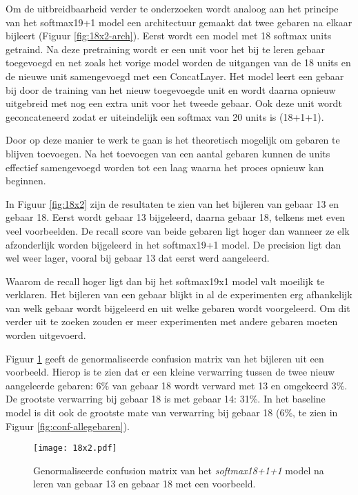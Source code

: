 Om de uitbreidbaarheid verder te onderzoeken wordt analoog aan het principe van het softmax19+1 model een architectuur gemaakt dat twee gebaren na elkaar bijleert (Figuur \ref{fig:18x2-arch}). Eerst wordt een model met 18 softmax units getraind. Na deze pretraining wordt er een unit voor het bij te leren gebaar toegevoegd en net zoals het vorige model worden de uitgangen van de 18 units en de nieuwe unit samengevoegd met een ConcatLayer.
\npar Het model leert een gebaar bij door de training van het nieuw toegevoegde unit en wordt daarna opnieuw uitgebreid met nog een extra unit voor het tweede gebaar. Ook deze unit wordt geconcateneerd zodat er uiteindelijk een softmax van 20 units is (18+1+1).

\npar Door op deze manier te werk te gaan is het theoretisch mogelijk om gebaren te blijven toevoegen. Na het toevoegen van een aantal gebaren kunnen de units effectief samengevoegd worden tot een laag waarna het proces opnieuw kan beginnen.

\npar In Figuur \ref{fig:18x2} zijn de resultaten te zien van het bijleren van gebaar 13 en gebaar 18. Eerst wordt gebaar 13 bijgeleerd, daarna gebaar 18, telkens met even veel voorbeelden. De recall score van beide gebaren ligt hoger dan wanneer ze elk afzonderlijk worden bijgeleerd in het softmax19+1 model. De precision ligt dan wel weer lager, vooral bij gebaar 13 dat eerst werd aangeleerd.

\npar Waarom de recall hoger ligt dan bij het softmax19x1 model valt moeilijk te verklaren. Het bijleren van een gebaar blijkt in al de experimenten erg afhankelijk van welk gebaar wordt bijgeleerd en uit welke gebaren wordt voorgeleerd. Om dit verder uit te zoeken zouden er meer experimenten met andere gebaren moeten worden uitgevoerd.

\npar Figuur \ref{fig:conf-18x2} geeft de genormaliseerde confusion matrix van het bijleren uit een voorbeeld. Hierop is te zien dat er een kleine verwarring tussen de twee nieuw aangeleerde gebaren: 6\% van gebaar 18 wordt verward met 13 en omgekeerd 3\%. De grootste verwarring bij gebaar 18 is met gebaar 14: 31\%. In het baseline model is dit ook de grootste mate van verwarring bij gebaar 18 (6\%, te zien in Figuur \ref{fig:conf-allegebaren}).


\begin{figure}
	\centering
	\texttt{[image: 18x2.pdf]}
	\caption{Precision en recall na het bijleren van gebaar 13 en gebaar 18 in het \textit{softmax18+1+1} model. Ter vergelijking is het resultaat van het \textit{softmax19+1} model ook uitgetekend.}\label{fig:18x2}
	\vspace{1.5cm}
	\def\svgwidth{0.7\columnwidth}
	
	\caption{Genormaliseerde confusion matrix van het \textit{softmax18+1+1} model na leren van gebaar 13 en gebaar 18 met een voorbeeld.}\label{fig:conf-18x2}
\end{figure}